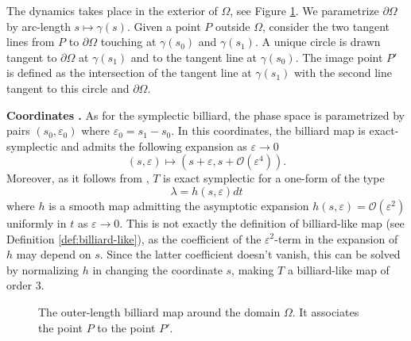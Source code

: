 \documentclass[10pt]{article}
\begin{document}
The dynamics takes place in the exterior of $\Omega$, see Figure \ref{fig:outer_length_billiard_reflection}. We parametrize $\partial\Omega$ by arc-length $s\mapsto\gamma(s)$. Given a point $P$ outside $\Omega$, consider the two tangent lines from $P$ to $\partial\Omega$ touching at $\gamma(s_0)$ and $\gamma(s_1)$. A unique circle is drawn tangent to $\partial\Omega$ at $\gamma(s_1)$ and to the tangent line at $\gamma(s_0)$. The image point $P'$ is defined as the intersection of the tangent line at $\gamma(s_1)$ with the second line tangent to this circle and $\partial\Omega$.

\medskip
\noindent \textbf{Coordinates \cite{BBF}.} 
As for the symplectic billiard, the phase space is parametrized by pairs $(s_0, \varepsilon_0)$ where $\varepsilon_0 = s_1 - s_0$. In this coordinates, the billiard map is exact-symplectic and admits the following expansion as $\varepsilon \to 0$
\[
(s, \varepsilon) \mapsto (s + \varepsilon, s + \mathcal{O}(\varepsilon^4)).
\]
Moreover, as it follows from \cite[Section 3]{BBF}, $T$ is exact symplectic for a one-form of the type
\[
\lambda = h(s,\varepsilon)dt
\]
where $h$ is a smooth map admitting the asymptotic expansion $h(s,\varepsilon) = \mathcal O(\varepsilon^2)$ uniformly in $t$ as $\varepsilon\to 0$. This is not exactly the definition of billiard-like map (see Definition \ref{def:billiard-like}), as the coefficient of the $\varepsilon^2$-term in the expansion of $h$ may depend on $s$. Since the latter coefficient doesn't vanish, this can be solved by normalizing $h$ in changing the coordinate $s$, making $T$ a billiard-like map of order $3$.

\begin{figure}[ht!]
    \centering
{}
    \caption{The outer-length billiard map around the domain $\Omega$. It associates the point $P$ to the point $P'$.}
    \label{fig:outer_length_billiard_reflection}
\end{figure}
\end{document}
